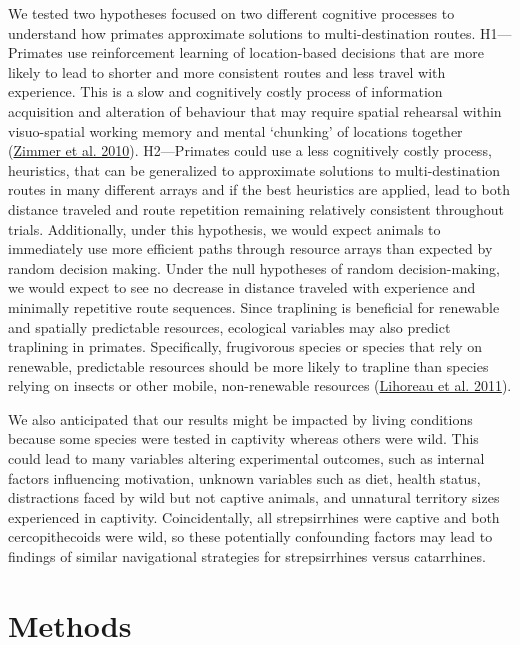 \documentclass[twoside,12pt,final]{ucthesis-CA2012}
\begin{document}
\begin{ucmainmatter}
We tested two hypotheses focused on two different cognitive processes to understand how primates approximate solutions to multi-destination routes. H1---Primates use reinforcement learning of location-based decisions that are more likely to lead to shorter and more consistent routes and less travel with experience. This is a slow and cognitively costly process of information acquisition and alteration of behaviour that may require spatial rehearsal within visuo-spatial working memory and mental `chunking' of locations together (\protect\hyperlink{ref-zimmer2010}{Zimmer et al. 2010}). H2---Primates could use a less cognitively costly process, heuristics, that can be generalized to approximate solutions to multi-destination routes in many different arrays and if the best heuristics are applied, lead to both distance traveled and route repetition remaining relatively consistent throughout trials. Additionally, under this hypothesis, we would expect animals to immediately use more efficient paths through resource arrays than expected by random decision making. Under the null hypotheses of random decision-making, we would expect to see no decrease in distance traveled with experience and minimally repetitive route sequences. Since traplining is beneficial for renewable and spatially predictable resources, ecological variables may also predict traplining in primates. Specifically, frugivorous species or species that rely on renewable, predictable resources should be more likely to trapline than species relying on insects or other mobile, non-renewable resources (\protect\hyperlink{ref-lihoreau2011}{Lihoreau et al. 2011}).

We also anticipated that our results might be impacted by living conditions because some species were tested in captivity whereas others were wild. This could lead to many variables altering experimental outcomes, such as internal factors influencing motivation, unknown variables such as diet, health status, distractions faced by wild but not captive animals, and unnatural territory sizes experienced in captivity. Coincidentally, all strepsirrhines were captive and both cercopithecoids were wild, so these potentially confounding factors may lead to findings of similar navigational strategies for strepsirrhines versus catarrhines.

\hypertarget{methods}{%
\section{Methods}\label{methods}}


\end{ucmainmatter}
\end{document}
